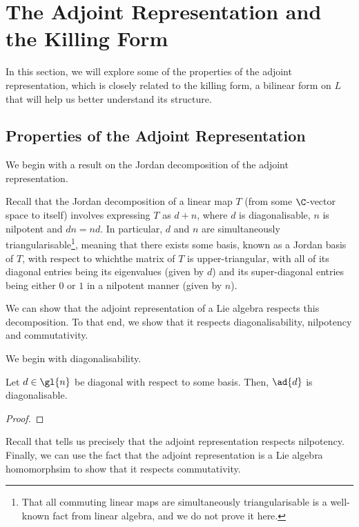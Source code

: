 \section{The Adjoint Representation and the Killing Form}

In this section, we will explore some of the properties of the adjoint representation, which is closely related to the killing form, a bilinear form on $L$ that will help us better understand its structure.

\subsection{Properties of the Adjoint Representation}

We begin with a result on the Jordan decomposition of the adjoint representation.

Recall that the Jordan decomposition of a linear map $T$ (from some $\C$-vector space to itself) involves expressing $T$ as $d + n$, where $d$ is diagonalisable, $n$ is nilpotent and $dn = nd$. In particular, $d$ and $n$ are simultaneously triangularisable\footnote{That all commuting linear maps are simultaneously triangularisable is a well-known fact from linear algebra, and we do not prove it here.}, meaning that there exists some basis, known as a Jordan basis of $T$, with respect to whichthe matrix of $T$ is upper-triangular, with all of its diagonal entries being its eigenvalues (given by $d$) and its super-diagonal entries being either $0$ or $1$ in a nilpotent manner (given by $n$).

We can show that the adjoint representation of a Lie algebra respects this decomposition. To that end, we show that it respects diagonalisability, nilpotency and commutativity.

We begin with diagonalisability.

\begin{boxlemma}\label{Ch2:Lemma:adDiagofDiag}
    Let $d \in \gl{n}$ be diagonal with respect to some basis. Then, $\ad{d}$ is diagonalisable.
\end{boxlemma}
\begin{proof}
    \sorry
\end{proof}

Recall that  tells us precisely that the adjoint representation respects nilpotency. Finally, we can use the fact that the adjoint representation is a Lie algebra homomorphsim to show that it respects commutativity.

